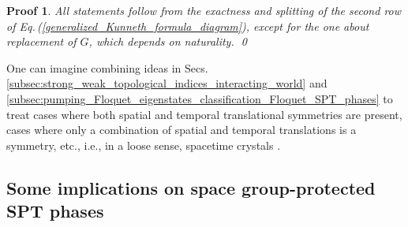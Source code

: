 \documentclass[sort&compress]{elsarticle}
\theoremstyle{theoremstyle}
\theoremstyle{framedtheoremstyle}
\theoremstyle{definitionstyle}
\theoremstyle{definitionstyle}
\theoremstyle{definitionstyle}
\theoremstyle{definitionstyle}
\theoremstyle{nameddefinitionstyle}
\theoremstyle{framednameddefinitionstyle}
\theoremstyle{proofstyle}
\newtheorem{pf}{Proof}
\theoremstyle{definitionstyle}
\newcommand{\paren}[1]{\left( #1 \right)}
\begin{document}
\begin{pf}
All statements follow from the exactness and splitting of the second row of Eq.\,(\ref{generalized_Kunneth_formula_diagram}), except for the one about replacement of $G$, which depends on naturality.
\qed\end{pf}

One can imagine combining ideas in Secs.\,\ref{subsec:strong_weak_topological_indices_interacting_world} and \ref{subsec:pumping_Floquet_eigenstates_classification_Floquet_SPT_phases} to treat cases where both spatial and temporal translational symmetries are present, cases where only a combination of spatial and temporal translations is a symmetry, etc., i.e., in a loose sense, spacetime crystals \cite{classicalTC, quantumTC, Li}.





\subsection{Some implications on space group-protected SPT phases \label{subsec:applications_space_group_protected_SPT_phases}}

\end{document}
